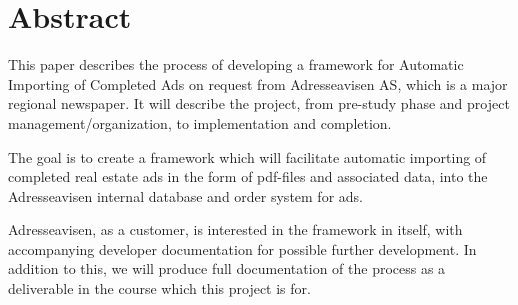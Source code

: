 \section{Abstract}

This paper describes the process of developing a framework for Automatic Importing of Completed Ads on request from Adresseavisen AS, which is a major regional newspaper. It will describe the project, from pre-study phase and project management/organization, to implementation and completion.

The goal is to create a framework which will facilitate automatic importing of completed real estate ads in the form of pdf-files and associated data, into the Adresseavisen internal database and order system for ads.

Adresseavisen, as a customer, is interested in the framework in itself, with accompanying developer documentation for possible further development. In addition to this, we will produce full documentation of the process as a deliverable in the course which this project is for.
